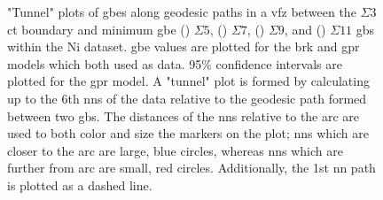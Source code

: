 \documentclass[final,twocolumn,12pt]{elsarticle}
\begin{document}
\begin{figure}[!htb]
\begin{subfigure}[b]{0.4\textwidth}
			\caption{}
			\label{fig:tunnel-3-11-olmsted}
		\end{subfigure}
		\caption{"Tunnel" plots of \glspl{gbe} along geodesic paths in a \gls{vfz} between the $\Sigma3$ \gls{ct} boundary and minimum \gls{gbe} () $\Sigma5$, () $\Sigma7$, () $\Sigma9$, and () $\Sigma11$ \glspl{gb} within the Ni \citet{olmstedSurveyComputedGrain2009} dataset. \Gls{gbe} values are plotted for the \gls{brk} and \gls{gpr} models which both used \citet{olmstedSurveyComputedGrain2009} as \inpt{} data. 95\% confidence intervals are plotted for the \gls{gpr} model. A "tunnel" plot is formed by calculating up to the 6th \glspl{nn} of the \inpt{} data relative to the geodesic path formed between two \glspl{gb}. The distances of the \glspl{nn} relative to the arc are used to both color and size the markers on the plot; \glspl{nn} which are closer to the arc are large, blue circles, whereas \glspl{nn} which are further from arc are small, red circles. Additionally, the 1st \gls{nn} path is plotted as a dashed line.}
		\label{fig:sigma-tunnels-olmsted}
	\end{figure}
	
\end{document}
